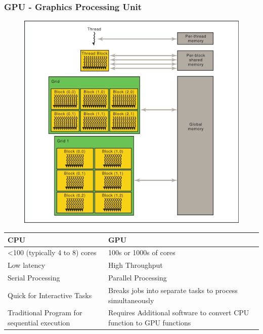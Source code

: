 \documentclass[xcolor=x11names,table]{beamer}
\begin{document}
	\begin{frame}[allowframebreaks]
		\frametitle{GPU - Graphics Processing Unit}
		\begin{figure}[!h]
			\centering
			\includegraphics[keepaspectratio=true,height=0.8\textheight]{refs/memory-hierarchy.png}
			\label{fig:gpu-architecture}
		\end{figure}
		\framebreak
		
		\begin{table}
  			\newcommand{\ColWidth}{0.3\linewidth}
			\renewcommand\_{\textunderscore\allowbreak}
			\begin{tabular}{|p{2in}|p{2in}|} \hline
				CPU & GPU  \\ \hline \hline
				<100 (typically 4 to 8) cores & 100s or 1000s of cores \\ \hline
				Low latency & High Throughput \\ \hline
				Serial Processing & Parallel Processing \\ \hline
				Quick for Interactive Tasks & Breaks jobs into separate tasks to process simultaneously \\ \hline
				Traditional Program for sequential execution & Requires Additional software to convert CPU function to GPU functions 	
				\\ \hline
			\end{tabular}
		\end{table}
	

\end{frame}
\end{document}
